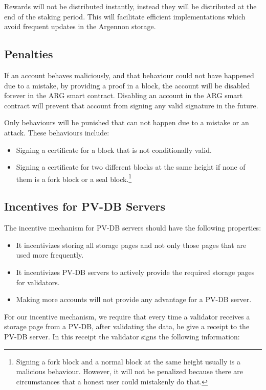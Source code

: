 Rewards will not be distributed instantly, instead they will be distributed at the end of the staking period.
This will facilitate efficient implementations which avoid frequent updates in the Argennon storage.

\subsection{Penalties}\label{subsec:penalties}

If an account behaves maliciously, and that behaviour could not have happened due to a mistake, by providing a proof
in a block, the account will be disabled forever in the ARG smart contract. Disabling an account in the
ARG smart contract will prevent that account from signing any valid signature in the future.

Only behaviours will be punished that can not happen due to a mistake or an attack. These behaviours include:
\begin{itemize}
    \item Signing a certificate for a block that is not conditionally valid.
    \item Signing a certificate for two different blocks at the same height if none of them
    is a fork block or a seal block.\footnote{Signing
    a fork block and a normal block at the same height usually is a malicious behaviour. However, it will not be
    penalized because there are circumstances that a honest user could mistakenly do that.}
\end{itemize}

\subsection{Incentives for PV-DB Servers}\label{subsec:PV-DB-servers}

The incentive mechanism for PV-DB servers should have the following properties:

\begin{itemize}
    \item It incentivizes storing all storage pages and not only those pages that are used more frequently.
    \item It incentivizes PV-DB servers to actively provide the required storage pages for validators.
    \item Making more accounts will not provide any advantage for a PV-DB server.
\end{itemize}

For our incentive mechanism, we require that every time a validator receives a storage page from a PV-DB, after
validating the data, he give a receipt to the PV-DB server. In this receipt the validator signs the
following information:

